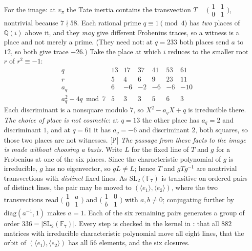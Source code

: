 \documentclass[11pt]{article}
\theoremstyle{plain}
\theoremstyle{definition}
\begin{document}
For the image: at $v_\pi$ the Tate inertia contains the transvection
$T=\bigl(\begin{smallmatrix}1&1\\0&1\end{smallmatrix}\bigr)$, nontrivial because
$7\nmid58$.  Each rational prime $q\equiv1\pmod4$ has \emph{two} places of
$\mathbb{Q}(i)$ above it, and they \emph{may} give different Frobenius traces, so a
witness is a place and not merely a prime.  (They need not: at $q=233$ both places
send $a$ to $12$, so both give trace $-26$.)  Take the place at which $i$ reduces to the smaller
root $r$ of $r^2\equiv-1$:
\[
 \begin{array}{r|rrrrrr}
  q          & 13 & 17 & 37 & 41 & 53 & 61\\\hline
  r          &  5 &  4 &  6 &  9 & 23 & 11\\
  a_q        &  6 & -6 & -2 & -6 & -6 & -10\\
  a_q^2-4q\bmod7 &  5 &  3 &  3 &  5 &  6 &  3
 \end{array}
\]
Each discriminant is a nonsquare modulo $7$, so $X^2-a_qX+q$ is irreducible there.
\emph{The choice of place is not cosmetic}: at $q=13$ the other place has $a_q=2$
and discriminant $1$, and at $q=61$ it has $a_q=-6$ and discriminant $2$, both
squares, so those two places are not witnesses.  \textup{[P]} \emph{The passage from these facts to the image is made without choosing
a basis.}  Write $L$ for the fixed line of $T$ and $g$ for a Frobenius at one of the six
places.  Since the characteristic polynomial of $g$ is irreducible, $g$ has no
eigenvector, so $gL\ne L$; hence $T$ and $gTg^{-1}$ are nontrivial transvections with
\emph{distinct} fixed lines.  As $\mathrm{SL}_2(\mathbb F_7)$ is transitive on ordered
pairs of distinct lines, the pair may be moved to $(\langle e_1\rangle,\langle
e_2\rangle)$, where the two transvections read
$\bigl(\begin{smallmatrix}1&a\\0&1\end{smallmatrix}\bigr)$ and
$\bigl(\begin{smallmatrix}1&0\\b&1\end{smallmatrix}\bigr)$ with $a,b\ne0$; conjugating
further by $\mathrm{diag}(a^{-1},1)$ makes $a=1$.  Each of the six remaining pairs
generates a group of order $336=|\mathrm{SL}_2(\mathbb F_7)|$.  Every step is checked in
the kernel in : that all $882$ matrices with irreducible
characteristic polynomial move all eight lines, that the orbit of
$(\langle e_1\rangle,\langle e_2\rangle)$ has all $56$ elements, and the six closures.
\end{document}
